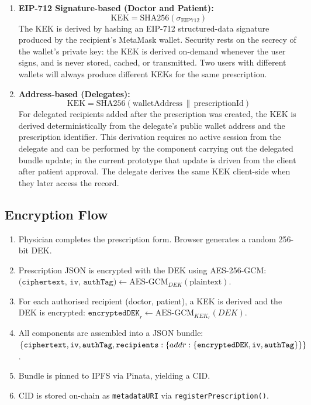 \documentclass[12pt,a4wide]{report}
\begin{document}
\begin{enumerate}
  \item \textbf{EIP-712 Signature-based (Doctor and Patient):}
    \[ \text{KEK} = \text{SHA256}(\sigma_{\text{EIP712}}) \]
    The KEK is derived by hashing an EIP-712 structured-data signature produced
    by the recipient's MetaMask wallet. Security rests on the secrecy of the
    wallet's private key: the KEK is derived on-demand whenever the user signs,
    and is never stored, cached, or transmitted. Two users with different wallets
    will always produce different KEKs for the same prescription.

  \item \textbf{Address-based (Delegates):}
    \[ \text{KEK} = \text{SHA256}(\text{walletAddress} \,\|\, \text{prescriptionId}) \]
    For delegated recipients added after the prescription was created, the KEK
    is derived deterministically from the delegate's public wallet address and
    the prescription identifier. This derivation requires no active session from
    the delegate and can be performed by the component carrying out the delegated
    bundle update; in the current prototype that update is driven from the client
    after patient approval. The delegate derives the same KEK client-side when
    they later access the record.
\end{enumerate}

\subsection{Encryption Flow}

\begin{enumerate}
  \item Physician completes the prescription form. Browser generates a random 256-bit DEK.
  \item Prescription JSON is encrypted with the DEK using AES-256-GCM:\\          
    $\texttt{(ciphertext, iv, authTag)} \leftarrow \text{AES-GCM}_{DEK}(\text{plaintext})$.
  \item For each authorised recipient (doctor, patient), a KEK is derived and the
    DEK is encrypted: $\texttt{encryptedDEK}_r \leftarrow \text{AES-GCM}_{KEK_r}(DEK)$.
  \item All components are assembled into a JSON bundle:
    $\{ \texttt{ciphertext}, \texttt{iv}, \texttt{authTag}, \\
    \texttt{recipients}: \{ addr: \{ \texttt{encryptedDEK}, \texttt{iv}, \texttt{authTag} \} \} \}$.
  \item Bundle is pinned to IPFS via Pinata, yielding a CID.
  \item CID is stored on-chain as \texttt{metadataURI} via \texttt{registerPrescription()}.
\end{enumerate}
\end{document}
